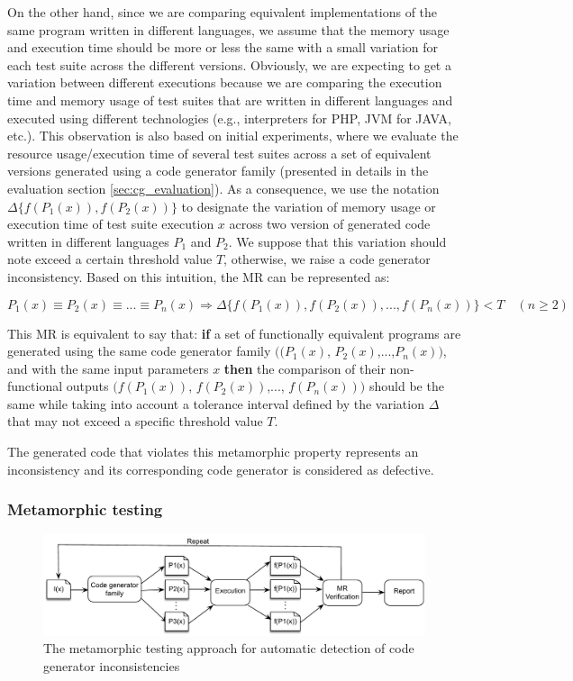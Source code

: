 On the other hand, since we are comparing equivalent implementations of the same program written in different languages, we assume that the memory usage and execution time should be more or less the same with a small variation for each test suite across the different versions. Obviously, we are expecting to get a variation between different executions because we are comparing the execution time and memory usage of test suites that are written in different languages and executed using different technologies (e.g., interpreters for PHP, JVM for JAVA, etc.). 
This observation is also based on initial experiments, where we evaluate the resource usage/execution time of several test suites across a set of equivalent versions generated using a code generator family (presented in details in the evaluation section \ref{sec:cg_evaluation}). As a consequence, we use the notation $\Delta\{f(P_{1}(x)), f(P_{2}(x))\}$ to designate the variation of memory usage or execution time of test suite execution $x$ across two version of generated code written in different languages $P_{1}$ and $P_{2}$. We suppose that this variation should note exceed a certain threshold value $T$, otherwise, we raise a code generator inconsistency.
Based on this intuition, the MR can be represented as:

\begin{equation}
P_{1}(x) \equiv P_{2}(x) \equiv ... \equiv P_{n}(x) \Rightarrow \Delta\{f(P_{1}(x)), f(P_{2}(x)),..., f(P_{n}(x))\} < T\quad (n\geqslant 2)
\end{equation}

This MR is equivalent to say that: \textbf{if} a set of functionally equivalent programs are generated using the same code generator family $((P_{1}(x)$, $P_{2}(x)$,...,$P_{n}(x))$, and with the same input parameters $x$ \textbf{then} the comparison of their non-functional outputs $(f(P_{1}(x))$, $f(P_{2}(x))$,..., $f(P_{n}(x)))$ should be the same while taking into account a tolerance interval defined by the variation $\Delta$ that may not exceed a specific threshold value $T$.

The generated code that violates this metamorphic property represents an inconsistency and its corresponding code generator is considered as defective.

 



\subsubsection[(Steps 2, 3, and 4)]{Metamorphic testing}
\label{sec:cg-Metamorphic testing}
\begin{figure}[h]
	\centering
	\includegraphics[width=1.\linewidth]{chapitre4/fig/MT}
	\caption{The metamorphic testing approach for automatic detection of code generator inconsistencies}
	\label{fig:cg_MT}
\end{figure}

